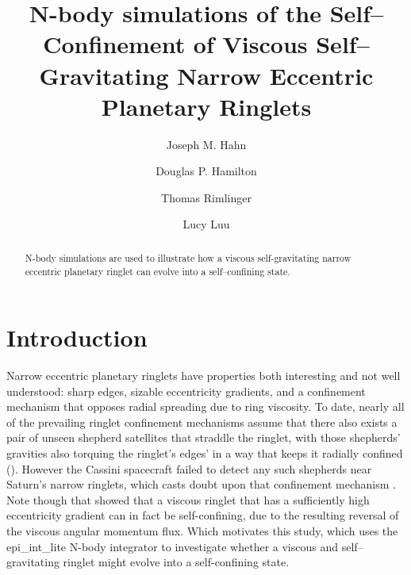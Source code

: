 \documentclass[preprint]{aastex62}
\begin{document}
\title{N-body simulations of the Self--Confinement of 
Viscous Self--Gravitating Narrow Eccentric Planetary Ringlets}


\author{Joseph M. Hahn}

\author{Douglas P. Hamilton}

\author{Thomas Rimlinger}

\author{Lucy Luu}


\begin{abstract}

N-body simulations are used
to illustrate how a viscous self-gravitating narrow eccentric planetary ringlet can evolve into a 
self--confining state.

\end{abstract}




\section{Introduction}
\label{sec:intro}

Narrow eccentric planetary ringlets have properties both interesting and
not well understood: sharp edges,
sizable eccentricity gradients, and a confinement mechanism that
opposes radial spreading due to ring viscosity. To date, nearly all of the
prevailing ringlet confinement mechanisms assume that there also exists a pair of 
unseen shepherd satellites that straddle the ringlet, with those shepherds' gravities
also torquing the ringlet's edges' in a way that keeps it radially confined 
(\citealt{GT79, GT79c, GT81, CG00, ME02}). However the Cassini spacecraft failed to detect
any such shepherds near Saturn's narrow ringlets, which casts doubt upon that confinement mechanism
\citep{L18}. Note though that \cite{BGT82} showed that a viscous ringlet that has
a sufficiently high eccentricity gradient can in fact be self-confining,
due to the resulting reversal of the viscous angular momentum flux. 
Which motivates this study, which uses the epi\_int\_lite N-body integrator to 
investigate whether a viscous and self--gravitating ringlet might evolve into a self-confining state.
\end{document}
